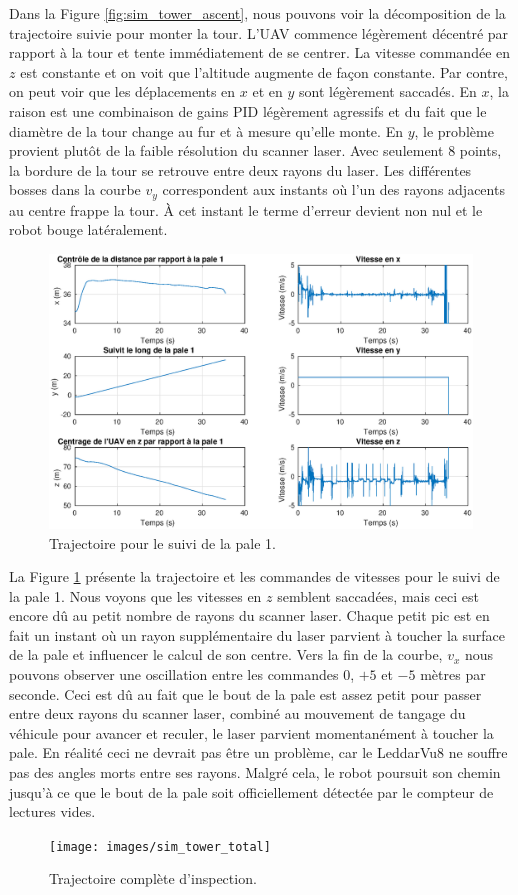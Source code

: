 Dans la Figure \ref{fig:sim_tower_ascent}, nous pouvons voir la décomposition de la trajectoire suivie pour monter la tour. L'UAV commence légèrement décentré par rapport à la tour et tente immédiatement de se centrer. La vitesse commandée en $z$ est constante et on voit que l'altitude augmente de façon constante. Par contre, on peut voir que les déplacements en $x$ et en $y$ sont légèrement saccadés. En $x$, la raison est une combinaison de gains PID légèrement agressifs et du fait que le diamètre de la tour change au fur et à mesure qu'elle monte. En $y$, le problème provient plutôt de la faible résolution du scanner laser. Avec seulement $8$ points, la bordure de la tour se retrouve entre deux rayons du laser. Les différentes bosses dans la courbe $v_y$ correspondent aux instants où l'un des rayons adjacents au centre frappe la tour. À cet instant le terme d'erreur devient non nul et le robot bouge latéralement.
\begin{figure}[htb]
  \centering
  \includegraphics[trim=30 20 30 0, clip, width=\linewidth]{images/sim_suivit_pale}
  \caption{Trajectoire pour le suivi de la pale 1.}
  \label{fig:sim_suivit_pale}
\end{figure}

La Figure \ref{fig:sim_suivit_pale} présente la trajectoire et les commandes de vitesses pour le suivi de la pale 1. Nous voyons que les vitesses en $z$ semblent saccadées, mais ceci est encore dû au petit nombre de rayons du scanner laser. Chaque petit pic est en fait un instant où un rayon supplémentaire du laser parvient à toucher la surface de la pale et influencer le calcul de son centre. Vers la fin de la courbe, $v_x$ nous pouvons observer une oscillation entre les commandes $0$, $+5$ et $-5$ mètres par seconde. Ceci est dû au fait que le bout de la pale est assez petit pour passer entre deux rayons du scanner laser, combiné au mouvement de tangage du véhicule pour avancer et reculer, le laser parvient momentanément à toucher la pale. En réalité ceci ne devrait pas être un problème, car le LeddarVu8 ne souffre pas des angles morts entre ses rayons. Malgré cela, le robot poursuit son chemin jusqu'à ce que le bout de la pale soit officiellement détectée par le compteur de lectures vides.
\begin{figure}[htb]
  \centering
  \texttt{[image: images/sim\_tower\_total]}
  \caption{Trajectoire complète d'inspection.}
  \label{fig:sim_tower_total}
\end{figure}

